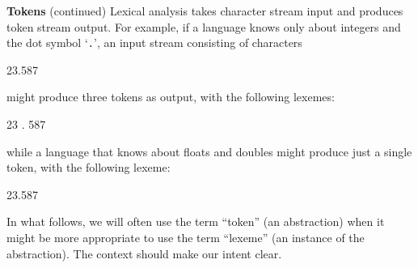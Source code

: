 \begin{minipage}[t]{\sw}
\slidenumber
\LARGE
{\bf Tokens} (continued)\exx
Lexical analysis takes character stream input
and produces token stream output.
For example, if a language knows only about integers
and the dot symbol `\verb'.'',
an input stream consisting of characters
\begin{qv}
23.587
\end{qv}
might produce three tokens as output, with the following lexemes:
\begin{qv}
23
.
587
\end{qv}
while a language that knows about floats and doubles
might produce just a single token, with the following lexeme:
\begin{qv}
23.587
\end{qv}
In what follows, we will often use the term
``token'' (an abstraction) when it might be more appropriate
to use the term ``lexeme'' (an instance of the abstraction). 
The context should make our intent clear.
\end{minipage}
\clearpage
